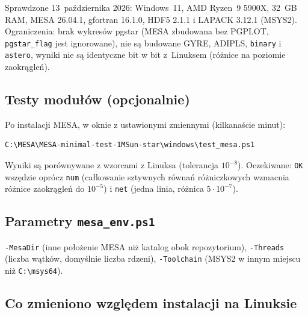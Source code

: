 \documentclass[11pt,a4paper]{article}
\begin{document}
Sprawdzone 13~października 2026: Windows~11, AMD Ryzen~9 5900X, 32~GB RAM, MESA 26.04.1,
gfortran 16.1.0, HDF5 2.1.1 i LAPACK 3.12.1 (MSYS2). Ograniczenia: brak wykresów pgstar (MESA zbudowana bez PGPLOT,
\texttt{pgstar\_flag} jest ignorowane), nie są budowane GYRE, ADIPLS, \texttt{binary} i
\texttt{astero}, wyniki nie są identyczne bit w bit z~Linuksem (różnice na poziomie zaokrągleń).

\subsection{Testy modułów (opcjonalnie)}

Po instalacji MESA, w oknie z ustawionymi zmiennymi (kilkanaście minut):
\begin{verbatim}
C:\MESA\MESA-minimal-test-1MSun-star\windows\test_mesa.ps1
\end{verbatim}
Wyniki są porównywane z wzorcami z Linuksa (tolerancja $10^{-8}$). Oczekiwane: \texttt{OK} wszędzie
oprócz \texttt{num} (całkowanie sztywnych równań różniczkowych wzmacnia różnice zaokrągleń do
$10^{-5}$) i \texttt{net} (jedna linia, różnica $5\cdot10^{-7}$).

\subsection{Parametry \texttt{mesa\_env.ps1}}

\texttt{-MesaDir} (inne położenie MESA niż katalog obok repozytorium), \texttt{-Threads}
(liczba wątków, domyślnie liczba rdzeni), \texttt{-Toolchain} (MSYS2 w innym miejscu niż
\verb!C:\msys64!).

\subsection{Co zmieniono względem instalacji na Linuksie}
\end{document}
